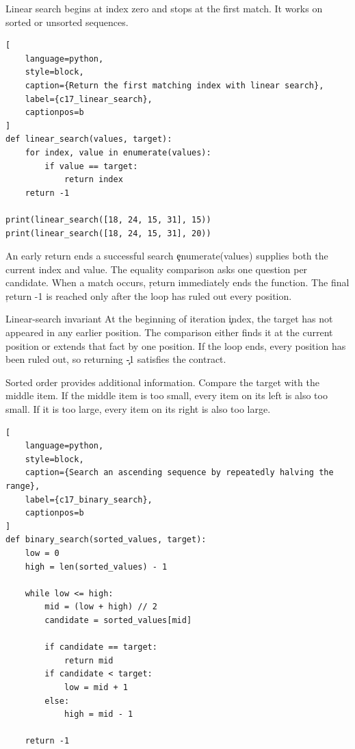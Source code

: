 Linear search begins at index zero and stops at the first match. It works on
sorted or unsorted sequences.

\begin{lstlisting}[
    language=python,
    style=block,
    caption={Return the first matching index with linear search},
    label={c17_linear_search},
    captionpos=b
]
def linear_search(values, target):
    for index, value in enumerate(values):
        if value == target:
            return index
    return -1

print(linear_search([18, 24, 15, 31], 15))
print(linear_search([18, 24, 15, 31], 20))
\end{lstlisting}

\begin{SyntaxBox}{An early return ends a successful search}
\c{enumerate(values)} supplies both the current index and value. The equality
comparison asks one question per candidate. When a match occurs, \c{return}
immediately ends the function. The final \c{return -1} is reached only after
the loop has ruled out every position.
\end{SyntaxBox}

\begin{ExplainBox}{Linear-search invariant}
At the beginning of iteration \c{index}, the target has not appeared in any
earlier position. The comparison either finds it at the current position or
extends that fact by one position. If the loop ends, every position has been
ruled out, so returning \c{-1} satisfies the contract.
\end{ExplainBox}


Sorted order provides additional information. Compare the target with the
middle item. If the middle item is too small, every item on its left is also
too small. If it is too large, every item on its right is also too large.

\begin{lstlisting}[
    language=python,
    style=block,
    caption={Search an ascending sequence by repeatedly halving the range},
    label={c17_binary_search},
    captionpos=b
]
def binary_search(sorted_values, target):
    low = 0
    high = len(sorted_values) - 1

    while low <= high:
        mid = (low + high) // 2
        candidate = sorted_values[mid]

        if candidate == target:
            return mid
        if candidate < target:
            low = mid + 1
        else:
            high = mid - 1

    return -1
\end{lstlisting}


